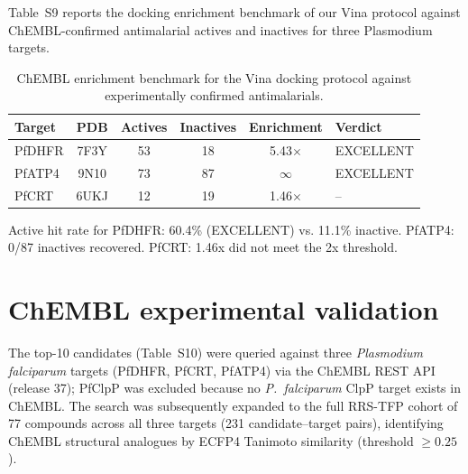 \documentclass[11pt,a4paper]{article}
\begin{document}
Table~S9 reports the docking enrichment benchmark of our Vina protocol against ChEMBL-confirmed antimalarial actives and inactives for three Plasmodium targets.

\begin{table}[htbp]
\centering
\caption{ChEMBL enrichment benchmark for the Vina docking protocol against experimentally confirmed antimalarials.}
\label{tab:chembl_enrichment}
\begin{tabularx}{\textwidth}{l c c c c l}
\toprule
Target & PDB & {Actives} & {Inactives} & {Enrichment} & Verdict \\
\midrule
PfDHFR & 7F3Y & 53 & 18 & 5.43$\times$ & EXCELLENT \\
PfATP4 & 9N10 & 73 & 87 & $\infty$ & EXCELLENT \\
PfCRT & 6UKJ & 12 & 19 & 1.46$\times$ & -- \\
\bottomrule
\end{tabularx}
\vspace{1mm}
\footnotesize Active hit rate for PfDHFR: 60.4\% (EXCELLENT) vs. 11.1\% inactive. PfATP4: 0/87 inactives recovered. PfCRT: 1.46x did not meet the 2x threshold.
\end{table}




\section{ChEMBL experimental validation}
\label{sec:chembl_validation}

The top-10 candidates (Table~S10) were queried against three \textit{Plasmodium falciparum} targets (PfDHFR, PfCRT, PfATP4) via the ChEMBL REST API (release 37); PfClpP was excluded because no \textit{P.~falciparum} ClpP target exists in ChEMBL. The search was subsequently expanded to the full RRS-TFP cohort of 77 compounds across all three targets (231 candidate--target pairs), identifying ChEMBL structural analogues by ECFP4 Tanimoto similarity (threshold $\geq 0.25$).
\end{document}
